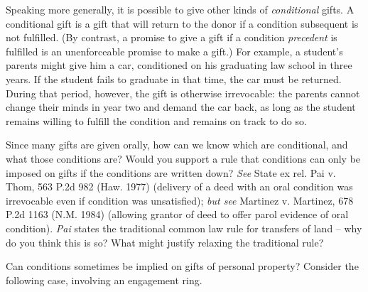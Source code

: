 Speaking more generally, it is possible to give other kinds of
\textit{conditional} gifts.  A conditional gift is a gift that will return to
the donor if a condition subsequent is not fulfilled.  (By contrast, a promise
to give a gift if a condition \textit{precedent} is fulfilled is an
unenforceable promise to make a gift.) For example, a student's parents might
give him a car, conditioned on his graduating law school in three years.  If
the student fails to graduate in that time, the car must be returned.  During
that period, however, the gift is otherwise irrevocable: the parents cannot
change their minds in year two and demand the car back, as long as the student
remains willing to fulfill the condition and remains on track to do so.

Since many gifts are given orally, how can we know which are conditional, and
what those conditions are?  Would you support a rule that conditions can only
be imposed on gifts if the conditions are written down?  \textit{See} State ex
rel. Pai v. Thom, 563 P.2d 982 (Haw. 1977) (delivery of a deed with an oral
condition was irrevocable even if condition was unsatisfied); \textit{but see}
Martinez v. Martinez, 678 P.2d 1163 (N.M. 1984) (allowing grantor of deed to
offer parol evidence of oral condition).  \textit{Pai} states the traditional
common law rule for transfers of land -- why do you think this is so?  What
might justify relaxing the traditional rule?

Can conditions sometimes be implied on gifts of personal property? Consider the
following case, involving an engagement ring.

